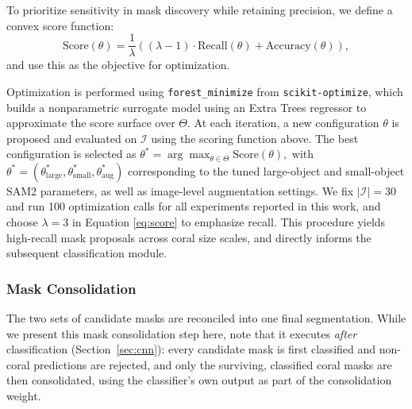 \documentclass[11pt]{elsarticle}
\begin{document}
To prioritize sensitivity in mask discovery while retaining precision, we define a convex score function:
\begin{equation}
\label{eq:score}
    \text{Score}(\theta) = \frac{1}{\lambda} \left((\lambda-1) \cdot \text{Recall}(\theta) + \text{Accuracy}(\theta)\right),
\end{equation}
and use this as the objective for optimization.

Optimization is performed using \texttt{forest\_minimize} from \texttt{scikit-optimize}, which builds a nonparametric surrogate model using an Extra Trees regressor to approximate the score surface over $\Theta$. At each iteration, a new configuration $\theta$ is proposed and evaluated on $\mathcal{I}$ using the scoring function above. The best configuration is selected as $\theta^* = \arg\max_{\theta \in \Theta} \text{Score}(\theta),$ with $\theta^* = (\theta^*_\text{large}, \theta^*_\text{small}, \theta^*_\text{aug})$ corresponding to the tuned large-object and small-object SAM2 parameters, as well as image-level augmentation settings. We fix $|\mathcal{I}| = 30$ and run 100 optimization calls for all experiments reported in this work, and choose $\lambda=3$ in Equation \ref{eq:score} to emphasize recall. This procedure yields high-recall mask proposals across coral size scales, and directly informs the subsequent classification module.

\subsubsection{Mask Consolidation}
\label{sec:mask_cons}

The two sets of candidate masks are reconciled into one final segmentation. While we present this mask consolidation step here, note that it executes \emph{after} classification (Section~\ref{sec:cnn}): every candidate mask is first classified and non-coral predictions are rejected, and only the surviving, classified coral masks are then consolidated, using the classifier's own output as part of the consolidation weight.
\end{document}
